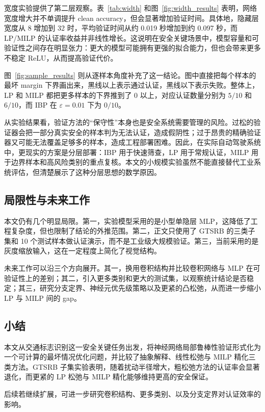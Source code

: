 \documentclass[11pt,a4paper]{ctexart}
\begin{document}
宽度实验提供了第二层观察。表~\ref{tab:width} 和图~\ref{fig:width_results} 表明，网络宽度增大并不单调提升 clean accuracy，但会显著增加验证时间。具体地，隐藏层宽度从 8 增加到 32 时，平均验证时间从约 0.019 秒增加到约 0.097 秒，而 LP/MILP 的认证率收益并非线性增长。这说明在安全关键场景中，模型容量和可验证性之间存在明显张力：更大的模型可能拥有更强的拟合能力，但也会带来更多不稳定 ReLU，从而提高验证代价。

图~\ref{fig:sample_results} 则从逐样本角度补充了这一结论。图中直接把每个样本的最坏 margin 下界画出来，黑线以上表示通过认证，黑线以下表示失败。整体上，LP 和 MILP 都把更多样本的下界推到了 0 以上，对应认证数量分别为 $5/10$ 和 $6/10$，而 IBP 在 $\varepsilon=0.01$ 下为 $0/10$。


从实验结果看，验证方法的“保守性”本身也是安全系统需要管理的风险。过松的验证器会把一部分真实安全的样本判为无法认证，造成假阴性；过于昂贵的精确验证器又可能无法覆盖足够多的样本，造成工程部署困难。因此，在实际自动驾驶系统中，更现实的方案是分层部署：IBP 用于快速筛查，LP 用于常规认证，MILP 用于边界样本和高风险类别的重点复核。本文的小规模实验虽然不能直接替代工业系统评估，但清楚展示了这种分层思想的数学原因。

\subsection{局限性与未来工作}
本文仍有几个明显局限。第一，实验模型采用的是小型单隐层 MLP，这降低了工程复杂度，但也限制了结论的外推范围。第二，正文只使用了 GTSRB 的三类子集和 10 个测试样本做认证演示，而不是工业级大规模验证。第三，当前采用的是灰度缩放输入，这在一定程度上简化了视觉结构。

未来工作可以沿三个方向展开。其一，换用卷积结构并比较卷积网络与 MLP 在可验证性上的差别；其二，引入更多类别和更大的测试集，以观察统计结论是否稳定；其三，研究分支定界、神经元优先级策略以及更紧的凸松弛，从而进一步缩小 LP 与 MILP 间的 gap。

\subsection{小结}
本文从交通标志识别这一安全关键任务出发，将神经网络局部鲁棒性验证形式化为一个可计算的最坏情况优化问题，并比较了抽象解释、线性松弛与 MILP 精化三类方法。GTSRB 子集实验表明，随着扰动半径增大，粗松弛方法的认证率会显著退化，而更紧的 LP 松弛与 MILP 精化能够维持更高的安全保证。

后续若继续扩展，可进一步研究卷积结构、更多类别、以及分支定界对认证效率的影响。
\end{document}
